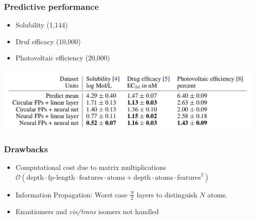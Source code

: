 \documentclass[xcolor=dvipsnames]{beamer}
\begin{document}
\begin{frame}
\frametitle{Predictive performance}
\begin{itemize}
\item Solubility (1,144)
\item Druf efficacy (10,000)
\item Photovoltaic efficiency (20,000)
\end{itemize}
\includegraphics[width=\linewidth]{img/results.png}
\end{frame}

\begin{frame}
\frametitle{Drawbacks}
\begin{itemize}
\item Computational cost due to matrix multiplications $\mathcal{O}(\textrm{depth} \cdot \textrm{fp-length} \cdot \textrm{features} \cdot \textrm{atoms} +  \textrm{depth} \cdot \textrm{atoms} \cdot \textrm{features}^2)$
\item Information Propagation: Worst case $\frac{N}{2}$ layers to distinguish $N$ atoms.
\item Enantiomers and \textit{cis/trans} isomers not handled
\end{itemize}

\end{frame}
\end{document}
